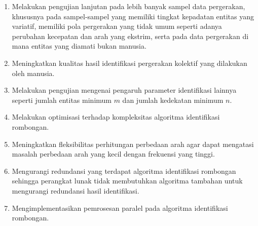 \begin{enumerate}
    \item Melakukan pengujian lanjutan pada lebih banyak sampel data pergerakan, khususnya pada sampel-sampel yang memiliki tingkat kepadatan entitas yang variatif, memiliki pola pergerakan yang tidak umum seperti adanya perubahan kecepatan dan arah yang ekstrim, serta pada data pergerakan di mana entitas yang diamati bukan manusia.
    \item Meningkatkan kualitas hasil identifikasi pergerakan kolektif yang dilakukan oleh manusia.
    \item Melakukan pengujian mengenai pengaruh parameter identifikasi lainnya seperti jumlah entitas minimum $m$ dan jumlah kedekatan minimum $n$.
    \item Melakukan optimisasi terhadap kompleksitas algoritma identifikasi rombongan.
    \item Meningkatkan fleksibilitas perhitungan perbedaan arah agar dapat mengatasi masalah perbedaan arah yang kecil dengan frekuensi yang tinggi.
    \item Mengurangi redundansi yang terdapat algoritma identifikasi rombongan sehingga perangkat lunak tidak membutuhkan algoritma tambahan untuk mengurangi redundansi hasil identifikasi.
    \item Mengimplementasikan pemrosesan paralel pada algoritma identifikasi rombongan.
\end{enumerate}